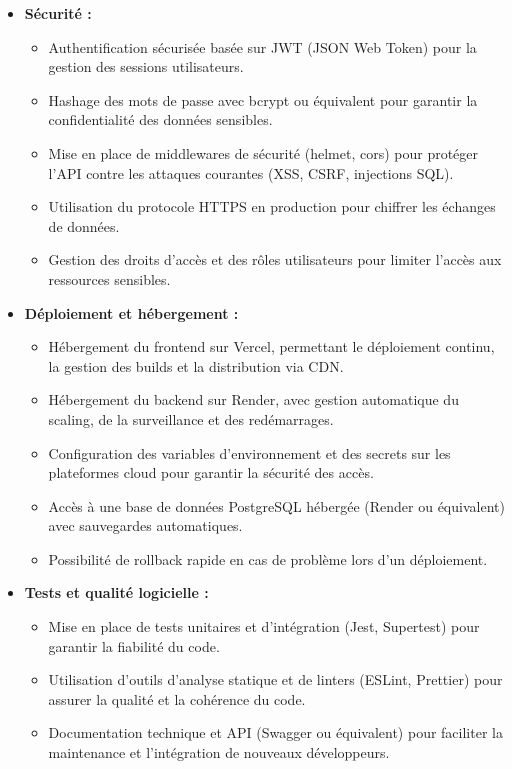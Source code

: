 \documentclass[12pt,a4paper]{report}
\begin{document}
\begin{itemize}
\begin{itemize}
    \end{itemize}
    \item \textbf{Sécurité :}
    \begin{itemize}
        \item Authentification sécurisée basée sur JWT (JSON Web Token) pour la gestion des sessions utilisateurs.
        \item Hashage des mots de passe avec bcrypt ou équivalent pour garantir la confidentialité des données sensibles.
        \item Mise en place de middlewares de sécurité (helmet, cors) pour protéger l’API contre les attaques courantes (XSS, CSRF, injections SQL).
        \item Utilisation du protocole HTTPS en production pour chiffrer les échanges de données.
        \item Gestion des droits d’accès et des rôles utilisateurs pour limiter l’accès aux ressources sensibles.
    \end{itemize}
    \item \textbf{Déploiement et hébergement :}
    \begin{itemize}
        \item Hébergement du frontend sur Vercel, permettant le déploiement continu, la gestion des builds et la distribution via CDN.
        \item Hébergement du backend sur Render, avec gestion automatique du scaling, de la surveillance et des redémarrages.
        \item Configuration des variables d’environnement et des secrets sur les plateformes cloud pour garantir la sécurité des accès.
        \item Accès à une base de données PostgreSQL hébergée (Render ou équivalent) avec sauvegardes automatiques.
        \item Possibilité de rollback rapide en cas de problème lors d’un déploiement.
    \end{itemize}
    \item \textbf{Tests et qualité logicielle :}
    \begin{itemize}
        \item Mise en place de tests unitaires et d’intégration (Jest, Supertest) pour garantir la fiabilité du code.
        \item Utilisation d’outils d’analyse statique et de linters (ESLint, Prettier) pour assurer la qualité et la cohérence du code.
        \item Documentation technique et API (Swagger ou équivalent) pour faciliter la maintenance et l’intégration de nouveaux développeurs.

\end{itemize}
\end{itemize}
\end{document}
